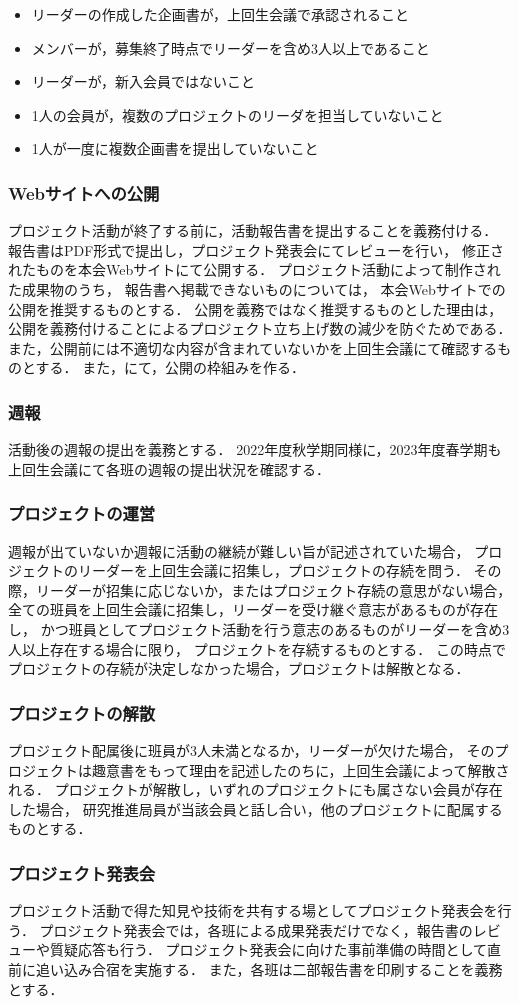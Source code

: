 \begin{itemize}
\item リーダーの作成した企画書が，上回生会議で承認されること
\item メンバーが，募集終了時点でリーダーを含め3人以上であること
\item リーダーが，新入会員ではないこと
\item 1人の会員が，複数のプロジェクトのリーダを担当していないこと
\item 1人が一度に複数企画書を提出していないこと
\end{itemize}

\subsubsection*{Webサイトへの公開}
プロジェクト活動が終了する前に，活動報告書を提出することを義務付ける．
報告書はPDF形式で提出し，プロジェクト発表会にてレビューを行い，
修正されたものを本会Webサイトにて公開する．
プロジェクト活動によって制作された成果物のうち，
報告書へ掲載できないものについては，
本会Webサイトでの公開を推奨するものとする．
公開を義務ではなく推奨するものとした理由は，
公開を義務付けることによるプロジェクト立ち上げ数の減少を防ぐためである．
また，公開前には不適切な内容が含まれていないかを上回生会議にて確認するものとする．
また，\syogaiDepartment{}にて，公開の枠組みを作る．

\subsubsection*{週報}
活動後の週報の提出を義務とする．
2022年度秋学期同様に，2023年度春学期も上回生会議にて各班の週報の提出状況を確認する．

\subsubsection*{プロジェクトの運営}
週報が出ていないか週報に活動の継続が難しい旨が記述されていた場合，
プロジェクトのリーダーを上回生会議に招集し，プロジェクトの存続を問う．
その際，リーダーが招集に応じないか，またはプロジェクト存続の意思がない場合，
全ての班員を上回生会議に招集し，リーダーを受け継ぐ意志があるものが存在し，
かつ班員としてプロジェクト活動を行う意志のあるものがリーダーを含め3人以上存在する場合に限り，
プロジェクトを存続するものとする．
この時点でプロジェクトの存続が決定しなかった場合，プロジェクトは解散となる．

\subsubsection*{プロジェクトの解散}
プロジェクト配属後に班員が3人未満となるか，リーダーが欠けた場合，
そのプロジェクトは趣意書をもって理由を記述したのちに，上回生会議によって解散される．
プロジェクトが解散し，いずれのプロジェクトにも属さない会員が存在した場合，
研究推進局員が当該会員と話し合い，他のプロジェクトに配属するものとする．

\subsubsection*{プロジェクト発表会}
プロジェクト活動で得た知見や技術を共有する場としてプロジェクト発表会を行う．
プロジェクト発表会では，各班による成果発表だけでなく，報告書のレビューや質疑応答も行う．
プロジェクト発表会に向けた事前準備の時間として直前に追い込み合宿を実施する．
また，各班は二部報告書を印刷することを義務とする．

